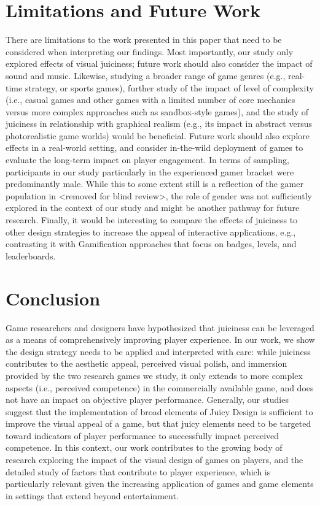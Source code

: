 \documentclass{sigchi}
\begin{document}
\section{Limitations and Future Work}
There are limitations to the work presented in this paper that need to be considered when interpreting our findings. Most importantly, our study only explored effects of visual juiciness; future work should also consider the impact of sound and music. Likewise, studying a broader range of game genres (e.g., real-time strategy, or sports games), further study of the impact of level of complexity (i.e., casual games and other games with a limited number of core mechanics versus more complex approaches such as sandbox-style games), and the study of juiciness in relationship with graphical realism (e.g., its impact in abstract versus photorealistic game worlds) would be beneficial. Future work should also explore effects in a real-world setting, and consider in-the-wild deployment of games to evaluate the long-term impact on player engagement. In terms of sampling, participants in our study particularly in the experienced gamer bracket were predominantly male. While this to some extent still is a reflection of the gamer population in <removed for blind review>, the role of gender was not sufficiently explored in the context of our study and might be another pathway for future research. Finally, it would be interesting to compare the effects of juiciness to other design strategies to increase the appeal of interactive applications, e.g., contrasting it with Gamification \cite{deterding2011game} approaches that focus on badges, levels, and leaderboards.
\section{Conclusion}
Game researchers and designers have hypothesized that juiciness can be leveraged as a means of comprehensively improving player experience. In our work, we show the design strategy needs to be applied and interpreted with care: while juiciness contributes to the aesthetic appeal, perceived visual polish, and immersion provided by the two research games we study, it only extends to more complex aspects (i.e., perceived competence) in the commercially available game, and does not have an impact on objective player  performance. Generally, our studies suggest that the implementation of broad elements of Juicy Design is sufficient to improve the visual appeal of a game, but that juicy elements need to be targeted toward indicators of player performance to successfully impact perceived competence. In this context, our work contributes to the growing body of research exploring the impact of the visual design of games on players, and the detailed study of factors that contribute to player experience, which is particularly relevant given the increasing application of games and game elements in settings that extend beyond entertainment.
\end{document}
